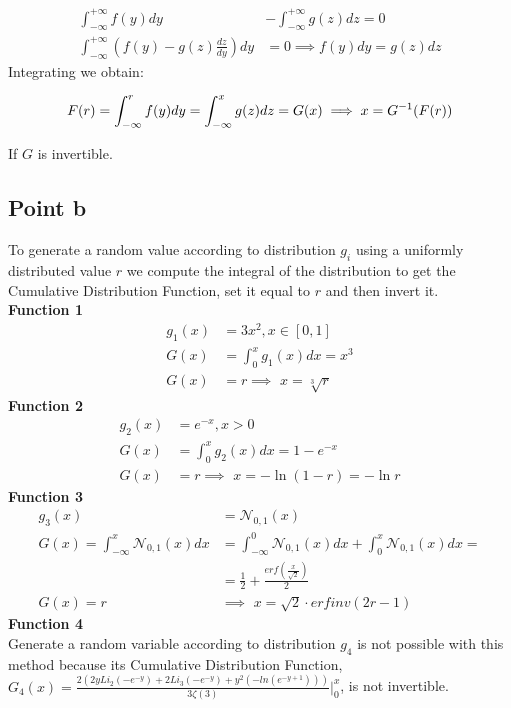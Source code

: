\documentclass{article}
\begin{document}
\begin{align*}
    \int_{-\infty}^{+\infty}{f(y)dy} &- \int_{-\infty}^{+\infty}{g(z)dz} = 0 \\
    \int_{-\infty}^{+\infty}{\left(f(y)-g(z) \frac{dz}{dy}\right)dy} &= 0 \implies f(y) dy = g(z) dz
\end{align*}
Integrating we obtain:

\begin{equation*}
    F(r) = \int_{-\infty}^{r}{f(y)dy} = \int_{-\infty}^{x}{g(z)dz} = G(x) \\
    \implies x = G^{-1}(F(r))    
\end{equation*}

If $G$ is invertible.
\subsection{Point b}
\label{Point b}
To generate a random value according to distribution $g_i$ using a uniformly distributed value $r$ we compute the integral of the distribution to get the Cumulative Distribution Function, set it equal to $r$ and then invert it.\\
\textbf{Function 1}
\begin{align*}
    g_1(x) &= 3x^2, x \in [0,1]\\
    G(x) &= \int_{0}^{x}{g_1(x)dx} = x^3\\
    G(x) &= r \implies \hspace{4pt} x = \sqrt[3]{r}
\end{align*}
\textbf{Function 2}
\begin{align*}
    g_2(x) &= e^{-x}, x > 0 \\
     G(x) &= \int_{0}^{x}{g_2(x)dx} = 1-e^{-x} \\
     G(x) &= r \implies \hspace{4pt} x = -\ln({1-r})=-\ln{r}
\end{align*}
\textbf{Function 3}
\begin{align*}
   g_3(x) &= \mathcal{N}_{0,1}(x) \\
   G(x) = \int_{-\infty}^{x}{\mathcal{N}_{0,1}(x)dx}&=\int_{-\infty}^{0}{\mathcal{N}_{0,1}(x)dx}+\int_{0}^{x}{\mathcal{N}_{0,1}(x)dx} = \\
   &= \frac{1}{2} + \frac{erf(\frac{x}{\sqrt{2}})}{2} \\
   G(x) = r &\implies \hspace{4pt} x = \sqrt{2} \cdot erfinv(2r-1)
\end{align*}
\textbf{Function 4}\\
Generate a random variable according to distribution $g_4$ is not possible with this method because its Cumulative Distribution Function, $G_4(x)=\frac{2(2yLi_2(-e^{-y})+2Li_3(-e^{-y})+y^2(-ln(e^{-y+1})))}{3\zeta(3)} \Big|_0^x$, is not invertible.
\end{document}
